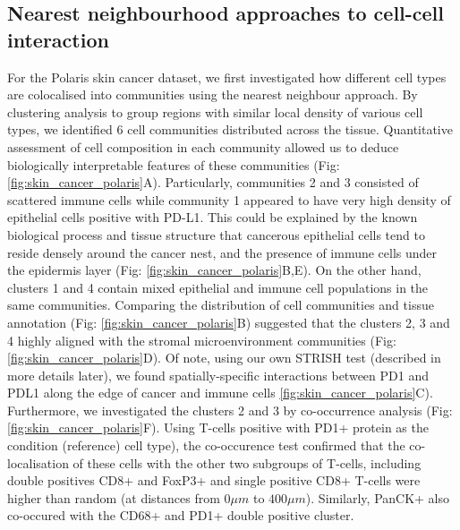 \subsection{Nearest neighbourhood approaches to cell-cell interaction}
For the Polaris skin cancer dataset, we first investigated how different cell types are colocalised into communities using the nearest neighbour approach. By clustering analysis to group regions with similar local density of various cell types, we identified 6 cell communities distributed across the tissue. Quantitative assessment of cell composition in each community allowed us to deduce biologically interpretable features of these communities (Fig: \ref{fig:skin_cancer_polaris}A). Particularly, communities 2 and 3 consisted of scattered immune cells while community 1 appeared to have very high density of epithelial cells positive with PD-L1. This could be explained by the known biological process and tissue structure that cancerous epithelial cells tend to reside densely around the cancer nest, and the presence of immune cells under the epidermis layer (Fig: \ref{fig:skin_cancer_polaris}B,E). On the other hand, clusters 1 and 4 contain mixed epithelial and immune cell populations in the same communities. Comparing the distribution of cell communities and tissue annotation (Fig: \ref{fig:skin_cancer_polaris}B) suggested that the clusters 2, 3 and 4 highly aligned with the stromal microenvironment communities (Fig: \ref{fig:skin_cancer_polaris}D).  Of note, using our own STRISH test (described in more details later), we found spatially-specific interactions between PD1 and PDL1 along the edge of cancer and immune cells \ref{fig:skin_cancer_polaris}C). Furthermore, we investigated the clusters 2 and 3 by co-occurrence analysis (Fig: \ref{fig:skin_cancer_polaris}F). Using T-cells positive with PD1+ protein as the condition (reference) cell type), the co-occurence test confirmed that the co-localisation of these cells with the other two subgroups of T-cells, including double positives CD8+ and FoxP3+ and single positive CD8+ T-cells were higher than random (at distances from $0\mu m$ to $400 \mu m$). Similarly, PanCK+ also co-occured with the CD68+ and PD1+ double positive cluster.       

